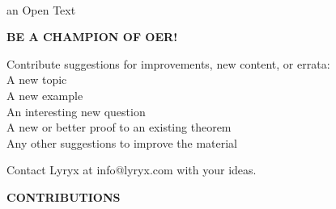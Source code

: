 \setcounter{page}{1}
\thispagestyle{empty}
\vspace{-3em}
\begin{center}
\end{center}

\vspace{-2em}

\begin{center}
 {\fontsize{24pt}{22pt}\selectfont \textcolor{titletextcolour}{\booksubtitle\;\booktitle}} \\ 
{\fontsize{16pt}{20pt}\selectfont \textcolor{titlemainbgcolour}{an Open Text}} 
\end{center}

\setlength{\parskip}{0pt}

\vfill

\begin{center} 
\fontsize{14pt}{16pt}\selectfont\textcolor{titletextcolour}{\textbf{BE A CHAMPION OF OER!}}
\end{center}

\begin{center}
Contribute suggestions for improvements, new content, or errata: \\
A new topic \\
A new example \\
An interesting new question \\
A new or better proof to an existing theorem \\
Any other suggestions to improve the material

\medskip

\noindent Contact Lyryx at \textcolor{titletextcolour}{info@lyryx.com} with your ideas.
\end{center}

\vfill

\begin{center}
\fontsize{14pt}{16pt}\selectfont\textcolor{titletextcolour}{\textbf{CONTRIBUTIONS}}
\end{center}

